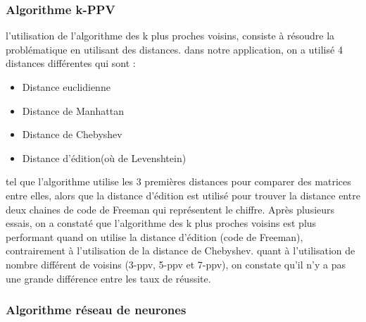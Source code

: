 \documentclass[10pt,a4paper]{report}
\begin{document}
\subsubsection{Algorithme k-PPV}
l'utilisation de l'algorithme des k plus proches voisins, consiste à résoudre la problématique en utilisant des distances.
dans notre application, on a utilisé 4 distances différentes qui sont : 
\begin{itemize}[label=$-$,leftmargin=*,parsep=0cm,itemsep=0cm,topsep=0cm]
\item Distance euclidienne
\item Distance de Manhattan 
\item Distance de Chebyshev
\item Distance d'édition(où de Levenshtein)
\end{itemize}
tel que l'algorithme utilise les 3 premières distances pour comparer des matrices entre elles, alors que la distance d'édition est utilisé pour trouver la distance entre deux chaines de code de Freeman qui représentent le chiffre.
Après plusieurs essais, on a constaté que l'algorithme des k plus proches voisins est plus performant quand on utilise la distance d'édition (code de Freeman), contrairement à l'utilisation de la distance de Chebyshev.
quant à l'utilisation de nombre différent de voisins (3-ppv, 5-ppv et 7-ppv), on constate qu'il n'y a pas une grande différence entre les taux de réussite.

\subsubsection{Algorithme réseau de neurones}
\end{document}
